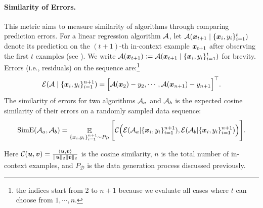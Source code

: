 \paragraph{Similarity of Errors.} This metric aims to measure similarity of algorithms through comparing prediction errors. For a linear regression algorithm ${\mathcal{A}}$,
let $ {\mathcal{A}}(\boldsymbol{x}_{t+1} \mid \{\boldsymbol{x}_i, y_i\}_{i=1}^{t})$ 
denote its prediction on the $(t+1)$-th in-context example $\boldsymbol{x}_{t+1}$ after observing the first $t$ examples (see ). 
We write ${\mathcal{A}}(\boldsymbol{x}_{t+1}) := {\mathcal{A}}(\boldsymbol{x}_{t+1} \mid \{\boldsymbol{x}_i, y_i\}_{i=1}^{t})$ for brevity. Errors (i.e., residuals) on the sequence are:\footnote{the indices start from 2 to $n+1$ because we evaluate all cases where $t$ can choose from $1,\cdots, n$.}
\begin{equation}
    {\mathcal{E}}({\mathcal{A}} \mid \{\boldsymbol{x}_i, y_i\}_{i=1}^{n+1}) = \Big[
        {\mathcal{A}}(\boldsymbol{x}_{2}) - y_2 ,\cdots, {\mathcal{A}}(\boldsymbol{x}_{n+1}) - y_{n+1}
   \Big]^\top. \nonumber
\end{equation}
The similarity of errors for two algorithms ${\mathcal{A}}_a$ and ${\mathcal{A}}_b$ is the expected cosine similarity of their errors on a randomly sampled data sequence:
\begin{equation*}
    \mathrm{SimE}({\mathcal{A}}_a, {\mathcal{A}}_b) 
    =   \mathop{\mathbb E}_{\{\boldsymbol{x}_i, y_i\}_{i=1}^{n+1} \sim P_{\mathcal{D}}} \Bigg[
    {\mathcal{C}}\Big({\mathcal{E}}({\mathcal{A}}_a | \{\boldsymbol{x}_i, y_i\}_{i=1}^{n+1}), 
    {\mathcal{E}}({\mathcal{A}}_b | \{\boldsymbol{x}_i, y_i\}_{i=1}^{n+1})\Big)\Bigg]. 
\end{equation*}

Here ${\mathcal{C}}(\boldsymbol{u}, \boldsymbol{v}) = \frac{
    \left\langle {\boldsymbol{u}, \boldsymbol{v}} \right\rangle
    }{\|\boldsymbol{u}\|_2 \|\boldsymbol{v}\|_2}$ is the cosine similarity, $n$ is the total number of in-context examples, and $P_{\mathcal{D}}$ is the data generation process discussed previously. 

